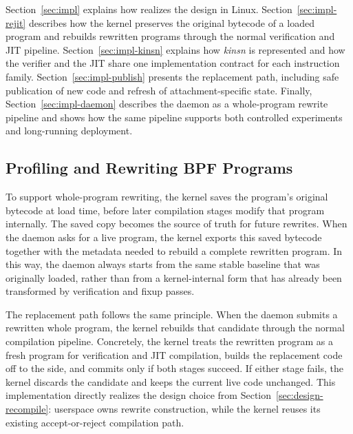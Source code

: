 
Section~\ref{sec:impl} explains how \tool realizes the design in Linux. Section~\ref{sec:impl-rejit} describes how the kernel preserves the original bytecode of a loaded program and rebuilds rewritten programs through the normal verification and JIT pipeline. Section~\ref{sec:impl-kinsn} explains how \emph{kinsn} is represented and how the verifier and the JIT share one implementation contract for each instruction family. Section~\ref{sec:impl-publish} presents the replacement path, including safe publication of new code and refresh of attachment-specific state. Finally, Section~\ref{sec:impl-daemon} describes the daemon as a whole-program rewrite pipeline and shows how the same pipeline supports both controlled experiments and long-running deployment.

\subsection{Profiling and Rewriting BPF Programs}
\label{subsec:impl-rejit}

To support whole-program rewriting, the kernel saves the program's original bytecode at load time, before later compilation stages modify that program internally. The saved copy becomes the source of truth for future rewrites. When the daemon asks for a live program, the kernel exports this saved bytecode together with the metadata needed to rebuild a complete rewritten program. In this way, the daemon always starts from the same stable baseline that was originally loaded, rather than from a kernel-internal form that has already been transformed by verification and fixup passes.

The replacement path follows the same principle. When the daemon submits a rewritten whole program, the kernel rebuilds that candidate through the normal compilation pipeline. Concretely, the kernel treats the rewritten program as a fresh program for verification and JIT compilation, builds the replacement code off to the side, and commits only if both stages succeed. If either stage fails, the kernel discards the candidate and keeps the current live code unchanged. This implementation directly realizes the design choice from Section~\ref{sec:design-recompile}: userspace owns rewrite construction, while the kernel reuses its existing accept-or-reject compilation path.

